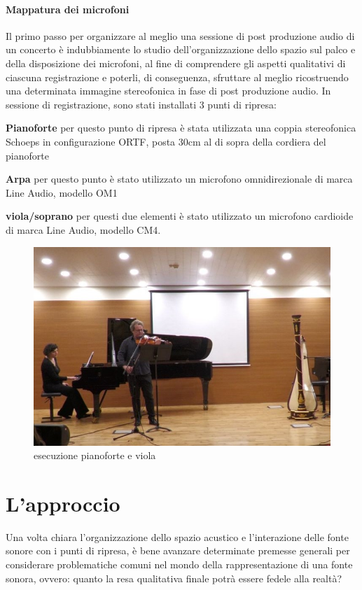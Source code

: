 	\paragraph{Mappatura dei microfoni}
	Il primo passo per organizzare al meglio una sessione di post produzione audio di un concerto è indubbiamente lo studio dell'organizzazione dello spazio sul palco e della disposizione dei microfoni, al fine di comprendere gli aspetti qualitativi di ciascuna registrazione e poterli, di conseguenza, sfruttare al meglio ricostruendo una determinata immagine stereofonica in fase di post produzione audio.
	In sessione di registrazione, sono stati installati 3 punti di ripresa:
		\begin{compactitem}
			\item \textbf{Pianoforte} per questo punto di ripresa è stata utilizzata una coppia stereofonica Schoeps in configurazione ORTF, posta 30cm al di sopra della cordiera del pianoforte
			\item \textbf{Arpa} per questo punto è stato utilizzato un microfono omnidirezionale di marca Line Audio, modello OM1
			\item \textbf{viola/soprano} per questi due elementi è stato utilizzato un microfono cardioide di marca Line Audio, modello CM4.
		\end{compactitem}
	
	\begin{figure}[h]
		\begin{center}
			\includegraphics[width= .50\textwidth, height = .15\textheight]{img/image2.jpg}
			\caption{esecuzione pianoforte e viola}
		\end{center}
	\end{figure}

\section{L'approccio}
Una volta chiara l'organizzazione dello spazio acustico e l'interazione delle fonte sonore con i punti di ripresa, è bene avanzare determinate premesse generali per considerare problematiche comuni nel mondo della rappresentazione di una fonte sonora, ovvero: quanto la resa qualitativa finale potrà essere fedele alla realtà?

